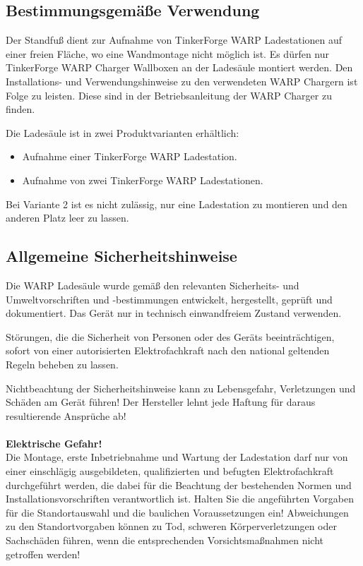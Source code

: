 \documentclass[a4paper,10pt]{article}
\newcommand{\warn}[1]{\begin{tcolorbox}[colback=boxred,colframe=red,coltext=
white,title=Warnung]#1\end{tcolorbox}}
\begin{document}
\begin{multicols*}{2}
	\subsection{Bestimmungsgemäße Verwendung}
	Der Standfuß dient zur Aufnahme von TinkerForge WARP Ladestationen auf einer freien Fläche, wo eine 
	Wandmontage nicht möglich ist. Es dürfen nur TinkerForge WARP Charger
	Wallboxen an der Ladesäule montiert werden. Den Installations- und
	Verwendungshinweise zu den verwendeten WARP Chargern ist Folge zu leisten.
	Diese sind in der Betriebsanleitung der WARP Charger zu finden.

	Die Ladesäule ist in zwei Produktvarianten erhältlich:
	\begin{itemize}
		\item Aufnahme einer TinkerForge WARP Ladestation.
		\item Aufnahme von zwei TinkerForge WARP Ladestationen.
	\end{itemize}
	
	Bei Variante 2 ist es nicht zulässig, nur eine Ladestation zu montieren und den anderen Platz leer zu lassen.

	\subsection{Allgemeine Sicherheitshinweise}

	Die WARP Ladesäule wurde gemäß den relevanten Sicherheits- und Umweltvorschriften und -bestimmungen
	entwickelt, hergestellt, geprüft und dokumentiert. Das Gerät nur in technisch einwandfreiem Zustand verwenden.

	Störungen, die die Sicherheit von Personen oder des Geräts beeinträchtigen,
	sofort von einer autorisierten Elektrofachkraft nach den national geltenden Regeln beheben zu lassen.

	\warn{Nichtbeachtung der Sicherheitshinweise kann zu Lebensgefahr,
	Verletzungen und Schäden am Gerät führen! Der Hersteller lehnt jede Haftung
	für daraus resultierende Ansprüche ab!
	\\
	\\
	\textbf{Elektrische Gefahr!}\\
	Die Montage, erste Inbetriebnahme und Wartung der Ladestation darf nur von einer einschlägig ausgebildeten, qualifizierten und befugten Elektrofachkraft durchgeführt werden, die dabei für die Beachtung der bestehenden Normen und Installationsvorschriften verantwortlich ist. Halten Sie die angeführten Vorgaben für die Standortauswahl und die baulichen Voraussetzungen ein! Abweichungen zu den Standortvorgaben können zu Tod, schweren Körperverletzungen oder Sachschäden führen, wenn die entsprechenden Vorsichtsmaßnahmen nicht getroffen werden!
	}


\end{multicols*}
\end{document}
